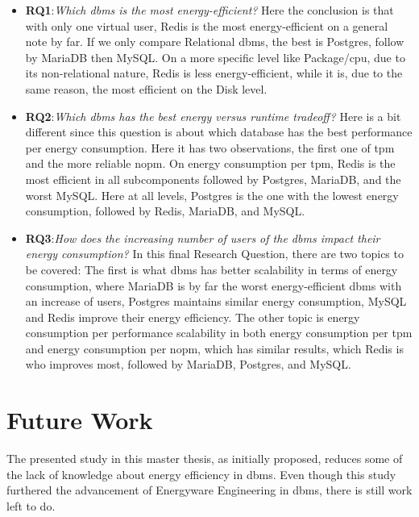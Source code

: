 \begin{itemize}
  \item \textbf{RQ1}:\textit{Which \acrlong{dbms} is the most energy-efficient?}
	Here the conclusion is that with only one virtual user, Redis is the most energy-efficient on a general note by far. If we only compare Relational \gls{dbms}, the best is Postgres, follow by MariaDB then MySQL. On a more specific level like Package/\gls{cpu}, due to its non-relational nature, Redis is less energy-efficient, while it is, due to the same reason, the most efficient on the Disk level.
    

 \item \textbf{RQ2}:\textit{Which \acrlong{dbms} has the best energy versus runtime tradeoff?}
Here is a bit different since this question is about which database has the best performance per energy consumption. Here it has two observations, the first one of \gls{tpm} and the more reliable \gls{nopm}.
On energy consumption per \gls{tpm}, Redis is the most efficient in all subcomponents followed by Postgres, MariaDB, and the worst MySQL.
Here at all levels, Postgres is the one with the lowest energy consumption, followed by Redis, MariaDB, and MySQL.

 
 
  \item \textbf{RQ3}:\textit{How does the increasing number of users of the \acrlong{dbms} impact their energy consumption? } In this final Research Question, there are two topics to be covered:
The first is what \gls{dbms} has better scalability in terms of energy consumption, where MariaDB is by far the worst energy-efficient \gls{dbms} with an increase of users, Postgres maintains similar energy consumption, MySQL and Redis improve their energy efficiency.
The other topic is energy consumption per performance scalability in both energy consumption per \gls{tpm} and energy consumption per \gls{nopm}, which has similar results, which Redis is who improves most, followed by MariaDB, Postgres, and MySQL.
\end{itemize}


\section{Future Work}

The presented study in this master thesis, as initially proposed, reduces some of the lack of knowledge about energy efficiency in \gls{dbms}.  Even though this study furthered the advancement of Energyware Engineering in \gls{dbms}, there is still work left to do.  

